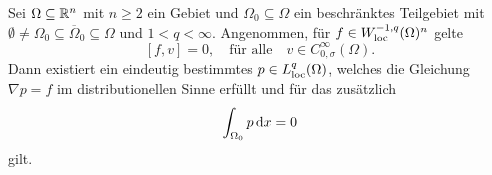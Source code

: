 \begin{lem}
  \label{lem:gradientCriterion}
  Sei $\Omega \subseteq \mathbb{R}^n$ mit $n \geq 2$ ein Gebiet und $\Omega_0 \subseteq \Omega$ ein beschränktes Teilgebiet mit $\emptyset \neq \Omega_0 \subseteq \overline\Omega_0 \subseteq \Omega$ und $1 < q < \infty$.
  Angenommen, für $f \in W_{\operatorname{loc}}^{-1,q}(\Omega)^n$ gelte
  \begin{equation}
    \label{eq:vKernel}
    [f,v] = 0, \quad \text{für alle} \quad v \in C_{0,\sigma}^\infty(\Omega).
  \end{equation}
  Dann existiert ein eindeutig bestimmtes $p \in L^q_{\operatorname{loc}}(\Omega)$, welches die Gleichung $\nabla p = f$ im distributionellen Sinne erfüllt und für das zusätzlich
  \begin{equation}
    \int_{\Omega_0} p \, {\operatorname{d}\!{x}} = 0
    \label{eq:0integral}
  \end{equation}
  gilt.
\end{lem}

